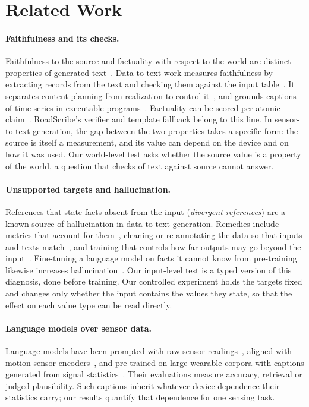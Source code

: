\section{Related Work}
\label{sec:related}

\paragraph{Faithfulness and its checks.}
Faithfulness to the source and factuality with respect to the world are distinct properties of generated text~\cite{maynez2020faithfulness,ji2023hallucination}.
Data-to-text work measures faithfulness by extracting records from the text and checking them against the input table~\cite{wiseman2017challenges}. It separates content planning from realization to control it~\cite{moryossef2019step,gatt2018survey}, and grounds captions of time series in executable programs~\cite{jhamtani2021truce}. Factuality can be scored per atomic claim~\cite{min2023factscore}.
RoadScribe's verifier and template fallback belong to this line.
In sensor-to-text generation, the gap between the two properties takes a specific form: the source is itself a measurement, and its value can depend on the device and on how it was used.
Our world-level test asks whether the source value is a property of the world, a question that checks of text against source cannot answer.

\paragraph{Unsupported targets and hallucination.}
References that state facts absent from the input (\emph{divergent references}) are a known source of hallucination in data-to-text generation. Remedies include metrics that account for them~\cite{dhingra2019parent}, cleaning or re-annotating the data so that inputs and texts match~\cite{dusek2019semantic,nie2019simple}, and training that controls how far outputs may go beyond the input~\cite{filippova2020controlled}.
Fine-tuning a language model on facts it cannot know from pre-training likewise increases hallucination~\cite{gekhman2024newknowledge}.
Our input-level test is a typed version of this diagnosis, done before training.
Our controlled experiment holds the targets fixed and changes only whether the input contains the values they state, so that the effect on each value type can be read directly.

\paragraph{Language models over sensor data.}
Language models have been prompted with raw sensor readings~\cite{xu2024penetrative}, aligned with motion-sensor encoders~\cite{li2025sensorllm}, and pre-trained on large wearable corpora with captions generated from signal statistics~\cite{zhang2025sensorlm}.
Their evaluations measure accuracy, retrieval or judged plausibility.
Such captions inherit whatever device dependence their statistics carry; our results quantify that dependence for one sensing task.

